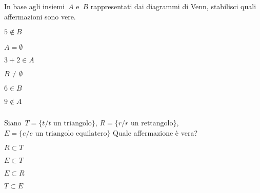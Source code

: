 \begin{esercizio}
\label{ese:6.22}
In base agli insiemi~$A$ e~$B$ rappresentati dai diagrammi di Venn, stabilisci 
quali affermazioni sono vere.
\begin{multicols}{2}
\TabPositions{2.5cm}
\begin{enumeratea}
\item $5\notin B$\tab\boxV\quad\boxF
\item $A=\emptyset $\tab\boxV\quad\boxF
\item $3+2\in A$\tab\boxV\quad\boxF
\item $B\neq \emptyset $\tab\boxV\quad\boxF
\item $6\in B$\tab\boxV\quad\boxF
\item $9\notin A$\tab\boxV\quad\boxF
\end{enumeratea}
\columnbreak

\end{multicols}
\end{esercizio}


\subsubsection*{}

\begin{esercizio}
\label{ese:7.1}
 Siano~$T=\{t / t\text{ un triangolo}\}$, $R=\{r / r\text{ un rettangolo}\}$,
$E=\{e / e\text{ un triangolo equilatero}\}$ Quale affermazione è vera?
\begin{multicols}{4}
\begin{enumeratea}
\item $R\subset T$
\item $E\subset T$
\item $E\subset R$
\item $T\subset E$
\end{enumeratea}
\end{multicols}
\end{esercizio}


